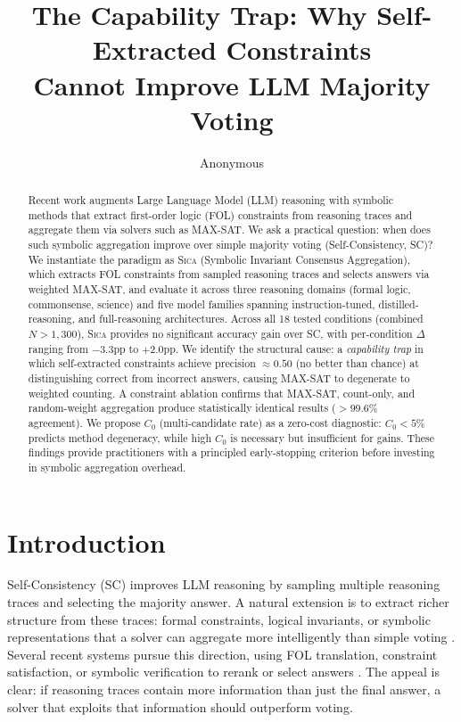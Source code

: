 \documentclass[11pt,a4paper]{article}
\title{The Capability Trap: Why Self-Extracted Constraints\\Cannot Improve LLM Majority Voting}
\author{Anonymous}
\date{}
\newcommand{\sica}{\textsc{Sica}}
\begin{document}
\maketitle

\begin{abstract}
Recent work augments Large Language Model (LLM) reasoning with symbolic methods that extract first-order logic (FOL) constraints from reasoning traces and aggregate them via solvers such as MAX-SAT.
We ask a practical question: when does such symbolic aggregation improve over simple majority voting (Self-Consistency, SC)?
We instantiate the paradigm as \sica{} (Symbolic Invariant Consensus Aggregation), which extracts FOL constraints from sampled reasoning traces and selects answers via weighted MAX-SAT, and evaluate it across three reasoning domains (formal logic, commonsense, science) and five model families spanning instruction-tuned, distilled-reasoning, and full-reasoning architectures.
Across all 18 tested conditions (combined $N{>}1{,}300$), \sica{} provides no significant accuracy gain over SC, with per-condition $\Delta$ ranging from $-3.3$pp to $+2.0$pp.
We identify the structural cause: a \emph{capability trap} in which self-extracted constraints achieve precision $\approx 0.50$ (no better than chance) at distinguishing correct from incorrect answers, causing MAX-SAT to degenerate to weighted counting.
A constraint ablation confirms that MAX-SAT, count-only, and random-weight aggregation produce statistically identical results ($>$99.6\% agreement).
We propose $C_0$ (multi-candidate rate) as a zero-cost diagnostic: $C_0{<}5\%$ predicts method degeneracy, while high $C_0$ is necessary but insufficient for gains.
These findings provide practitioners with a principled early-stopping criterion before investing in symbolic aggregation overhead.
\end{abstract}

\section{Introduction}
\label{sec:intro}

Self-Consistency (SC) \citep{wang2023selfconsistency} improves LLM reasoning by sampling multiple reasoning traces and selecting the majority answer.
A natural extension is to extract richer structure from these traces: formal constraints, logical invariants, or symbolic representations that a solver can aggregate more intelligently than simple voting \citep{pan2023logiclm,olausson2023linc}.
Several recent systems pursue this direction, using FOL translation, constraint satisfaction, or symbolic verification to rerank or select answers \citep{pan2023logiclm,olausson2023linc,dylos2026,aristotle2025,fover2025}.
The appeal is clear: if reasoning traces contain more information than just the final answer, a solver that exploits that information should outperform voting.
\end{document}
